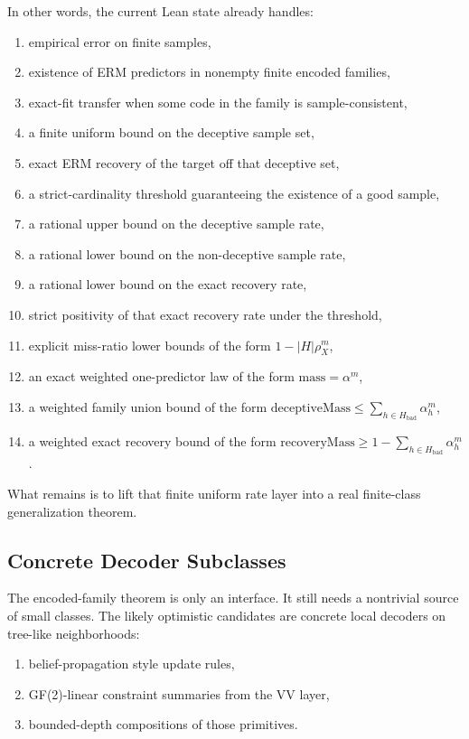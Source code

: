\documentclass[11pt]{article}
\theoremstyle{remark}
\begin{document}
In other words, the current Lean state already handles:
\begin{enumerate}[leftmargin=1.5em]
  \item empirical error on finite samples,
  \item existence of ERM predictors in nonempty finite encoded families,
  \item exact-fit transfer when some code in the family is sample-consistent,
  \item a finite uniform bound on the deceptive sample set,
  \item exact ERM recovery of the target off that deceptive set,
  \item a strict-cardinality threshold guaranteeing the existence of a good sample,
  \item a rational upper bound on the deceptive sample rate,
  \item a rational lower bound on the non-deceptive sample rate,
  \item a rational lower bound on the exact recovery rate,
  \item strict positivity of that exact recovery rate under the threshold,
  \item explicit miss-ratio lower bounds of the form \(1 - |H|\rho_X^m\),
  \item an exact weighted one-predictor law of the form \(\mathrm{mass} = \alpha^m\),
  \item a weighted family union bound of the form
  \(\mathrm{deceptiveMass} \le \sum_{h \in H_{\mathrm{bad}}}\alpha_h^m\),
  \item a weighted exact recovery bound of the form
  \(\mathrm{recoveryMass} \ge 1 - \sum_{h \in H_{\mathrm{bad}}}\alpha_h^m\).
\end{enumerate}

\noindent
What remains is to lift that finite uniform rate layer into a real finite-class
generalization theorem.

\subsection{Concrete Decoder Subclasses}

The encoded-family theorem is only an interface.  It still needs a nontrivial
source of small classes.  The likely optimistic candidates are concrete local
decoders on tree-like neighborhoods:
\begin{enumerate}[leftmargin=1.5em]
  \item belief-propagation style update rules,
  \item GF(2)-linear constraint summaries from the VV layer,
  \item bounded-depth compositions of those primitives.
\end{enumerate}
\end{document}
